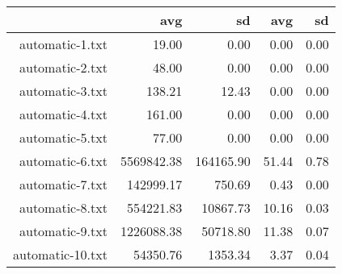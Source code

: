\begin{table}[ht]
\centering
\begin{tabular}{rrrrr}
  \toprule  & avg & sd & avg & sd \\ 
  \midrule automatic-1.txt & 19.00 & 0.00 & 0.00 & 0.00 \\ 
  automatic-2.txt & 48.00 & 0.00 & 0.00 & 0.00 \\ 
  automatic-3.txt & 138.21 & 12.43 & 0.00 & 0.00 \\ 
  automatic-4.txt & 161.00 & 0.00 & 0.00 & 0.00 \\ 
  automatic-5.txt & 77.00 & 0.00 & 0.00 & 0.00 \\ 
  automatic-6.txt & 5569842.38 & 164165.90 & 51.44 & 0.78 \\ 
  automatic-7.txt & 142999.17 & 750.69 & 0.43 & 0.00 \\ 
  automatic-8.txt & 554221.83 & 10867.73 & 10.16 & 0.03 \\ 
  automatic-9.txt & 1226088.38 & 50718.80 & 11.38 & 0.07 \\ 
  automatic-10.txt & 54350.76 & 1353.34 & 3.37 & 0.04 \\ 
   \bottomrule \end{tabular}
\end{table}
